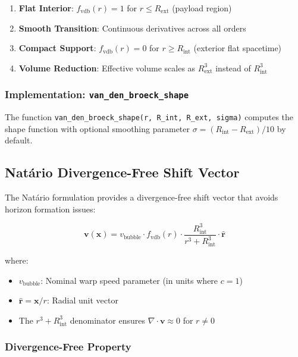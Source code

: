 \begin{enumerate}
\item \textbf{Flat Interior}: $f_{\text{vdb}}(r) = 1$ for $r \leq R_{\text{ext}}$ (payload region)
\item \textbf{Smooth Transition}: Continuous derivatives across all orders
\item \textbf{Compact Support}: $f_{\text{vdb}}(r) = 0$ for $r \geq R_{\text{int}}$ (exterior flat spacetime)
\item \textbf{Volume Reduction}: Effective volume scales as $R_{\text{ext}}^3$ instead of $R_{\text{int}}^3$
\end{enumerate}

\subsubsection{Implementation: \texttt{van\_den\_broeck\_shape}}

The function \texttt{van\_den\_broeck\_shape(r, R\_int, R\_ext, sigma)} computes the shape function with optional smoothing parameter $\sigma = (R_{\text{int}} - R_{\text{ext}})/10$ by default.

\subsection{Natário Divergence-Free Shift Vector}

The Natário formulation provides a divergence-free shift vector that avoids horizon formation issues:

\begin{equation}
\mathbf{v}(\mathbf{x}) = v_{\text{bubble}} \cdot f_{\text{vdb}}(r) \cdot \frac{R_{\text{int}}^3}{r^3 + R_{\text{int}}^3} \cdot \hat{\mathbf{r}}
\end{equation}

where:
\begin{itemize}
\item $v_{\text{bubble}}$: Nominal warp speed parameter (in units where $c = 1$)
\item $\hat{\mathbf{r}} = \mathbf{x}/r$: Radial unit vector
\item The $r^3 + R_{\text{int}}^3$ denominator ensures $\nabla \cdot \mathbf{v} \approx 0$ for $r \neq 0$
\end{itemize}

\subsubsection{Divergence-Free Property}

